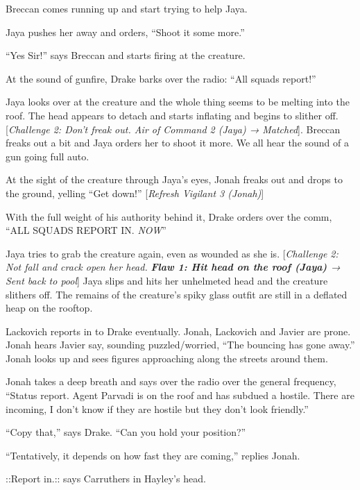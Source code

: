 Breccan comes running up and start trying to help Jaya.

Jaya pushes her away and orders, ``Shoot it some more.''

``Yes Sir!'' says Breccan and starts firing at the creature.

At the sound of gunfire, Drake barks over the radio: ``All squads report!''

Jaya looks over at the creature and the whole thing seems to be melting into the roof.  The head appears to detach and starts inflating and begins to slither off.  {[}\textit{Challenge 2: Don't freak out. Air of Command 2 (Jaya) → Matched}{]}.   Breccan freaks out a bit and Jaya orders her to shoot it more.  We all hear the sound of a gun going full auto.

At the sight of the creature through Jaya's eyes, Jonah freaks out and drops to the ground, yelling ``Get down!''  {[}\textit{Refresh Vigilant 3 (Jonah)}{]}



With the full weight of his authority behind it, Drake orders over the comm, ``ALL SQUADS REPORT IN.  \textit{NOW}''



Jaya tries to grab the creature again, even as wounded as she is.  {[}\textit{Challenge 2: Not fall and crack open her head.  }\textit{\textbf{ {\color[RGB]{255,0,0}Flaw 1: Hit head on the roof (Jaya) } }}\textit{→ Sent back to pool}{]}  Jaya slips and hits her unhelmeted head and the creature slithers off.  The remains of the creature's spiky glass outfit are still in a deflated heap on the rooftop.



Lackovich reports in to Drake eventually.  Jonah, Lackovich and Javier are prone.  Jonah hears Javier say, sounding puzzled/worried, ``The bouncing has gone away.''  Jonah looks up and sees figures approaching along the streets around them.

Jonah takes a deep breath and says over the radio over the general frequency, ``Status report. Agent Parvadi is on the roof and has subdued a hostile.  There are incoming, I don't know if they are hostile but they don't look friendly.''

``Copy that,'' says Drake.  ``Can you hold your position?''

``Tentatively, it depends on how fast they are coming,'' replies Jonah.



 {\color[RGB]{153,0,255}::Report in.::}  {\color[RGB]{147,196,125} } says Carruthers in Hayley's head.


